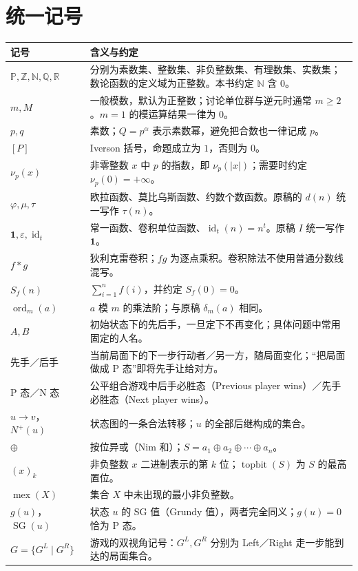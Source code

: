 \documentclass[a4paper,twoside,openright,11pt,fontset=fandol]{ctexbook}
\theoremstyle{definition}
\newcommand{\Z}{\mathbb Z}
\newcommand{\N}{\mathbb N}
\newcommand{\Pp}{\mathbb P}
\newcommand{\Q}{\mathbb Q}
\newcommand{\R}{\mathbb R}
\newcommand{\eps}{\varepsilon}
\newcommand{\one}{\mathbf 1}
\newcommand{\id}{\operatorname{id}}
\newcommand{\ord}{\operatorname{ord}}
\newcommand{\iva}[1]{\left[#1\right]}
\newcommand{\mex}{\operatorname{mex}}
\newcommand{\SG}{\operatorname{SG}}
\newcommand{\Np}{N^+}
\newcommand{\topbit}{\operatorname{topbit}}
\begin{document}
\section*{统一记号}
\begin{longtable}{p{}p{}}
\toprule
记号 & 含义与约定\\
\midrule
$\Pp,\Z,\N,\Q,\R$ & 分别为素数集、整数集、非负整数集、有理数集、实数集；数论函数的定义域为正整数。本书约定 $\N$ 含 $0$。\\
$m,M$ & 一般模数，默认为正整数；讨论单位群与逆元时通常 $m\ge2$。$m=1$ 的模运算结果一律为 $0$。\\
$p,q$ & 素数；$Q=p^\alpha$ 表示素数幂，避免把合数也一律记成 $p$。\\
$\iva{P}$ & Iverson 括号，命题成立为 $1$，否则为 $0$。\\
$\nu_p(x)$ & 非零整数 $x$ 中 $p$ 的指数，即 $\nu_p(|x|)$；需要时约定 $\nu_p(0)=+\infty$。\\
$\varphi,\mu,\tau$ & 欧拉函数、莫比乌斯函数、约数个数函数。原稿的 $d(n)$ 统一写作 $\tau(n)$。\\
$\one,\eps,\id_t$ & 常一函数、卷积单位函数、$\id_t(n)=n^t$。原稿 $I$ 统一写作 $\one$。\\
$f*g$ & 狄利克雷卷积；$fg$ 为逐点乘积。卷积除法不使用普通分数线混写。\\
$S_f(n)$ & $\sum_{i=1}^n f(i)$，并约定 $S_f(0)=0$。\\
$\ord_m(a)$ & $a$ 模 $m$ 的乘法阶；与原稿 $\delta_m(a)$ 相同。\\
$A,B$ & 初始状态下的先后手，一旦定下不再变化；具体问题中常用固定的人名。\\
先手／后手 & 当前局面下的下一步行动者／另一方，随局面变化；“把局面做成 P 态”即将先手让给对方。\\
P 态／N 态 & 公平组合游戏中后手必胜态（Previous player wins）／先手必胜态（Next player wins）。\\
$u\to v$，$\Np(u)$ & 状态图的一条合法转移；$u$ 的全部后继构成的集合。\\
$\oplus$ & 按位异或（Nim 和）；$S=a_1\oplus a_2\oplus\cdots\oplus a_n$。\\
$(x)_k$ & 非负整数 $x$ 二进制表示的第 $k$ 位；$\topbit(S)$ 为 $S$ 的最高置位。\\
$\mex(X)$ & 集合 $X$ 中未出现的最小非负整数。\\
$g(u)$，$\SG(u)$ & 状态 $u$ 的 SG 值（Grundy 值），两者完全同义；$g(u)=0$ 恰为 P 态。\\
$G=\{G^L\mid G^R\}$ & 游戏的双视角记号：$G^L,G^R$ 分别为 Left／Right 走一步能到达的局面集合。\\

\end{longtable}
\end{document}
